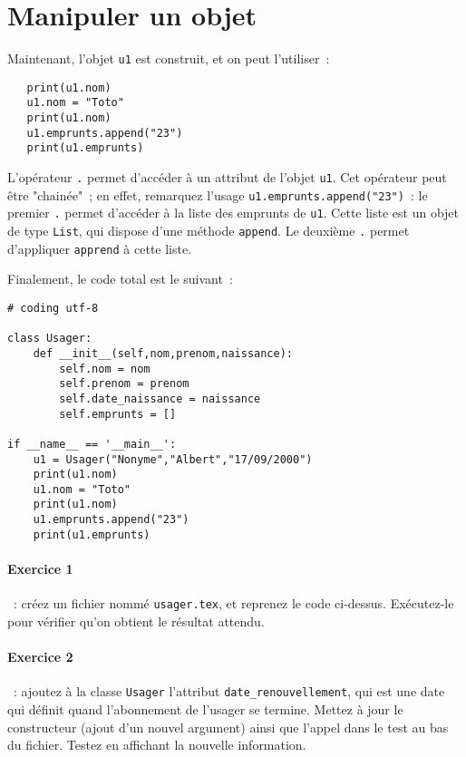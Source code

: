 \documentclass{article}
\begin{document}
\section{Manipuler un objet}

Maintenant, l'objet \texttt{u1} est construit, et on peut l'utiliser~:

\begin{verbatim}
   print(u1.nom)
   u1.nom = "Toto"
   print(u1.nom)
   u1.emprunts.append("23")
   print(u1.emprunts)
\end{verbatim}

L'opérateur \texttt{.} permet d'accéder à un attribut de l'objet \texttt{u1}. Cet opérateur peut être "chainée"~; en effet, remarquez l'usage  \texttt{u1.emprunts.append("23")}~: le premier \texttt{.} permet d'accéder à la liste des emprunts de \texttt{u1}. Cette liste est un objet de type \texttt{List}, qui dispose d'une méthode \texttt{append}. Le deuxième \texttt{.} permet d'appliquer \texttt{apprend} à cette liste. 

Finalement, le code total est le suivant~:


\begin{verbatim}
# coding utf-8

class Usager:
    def __init__(self,nom,prenom,naissance):
        self.nom = nom
        self.prenom = prenom
        self.date_naissance = naissance
        self.emprunts = []

if __name__ == '__main__':
    u1 = Usager("Nonyme","Albert","17/09/2000")
    print(u1.nom)
    u1.nom = "Toto"
    print(u1.nom)
    u1.emprunts.append("23")
    print(u1.emprunts)
\end{verbatim} 


\paragraph{Exercice 1}~: créez un fichier nommé \texttt{usager.tex}, et reprenez le code ci-dessus. Exécutez-le pour vérifier qu'on obtient le résultat attendu.


\paragraph{Exercice 2}~: ajoutez à la classe \texttt{Usager} l'attribut \texttt{date\_renouvellement}, qui est une date qui définit quand l'abonnement de l'usager se termine. Mettez à jour le constructeur (ajout d'un nouvel argument) ainsi que l'appel dans le test au bas du fichier. Testez en affichant la nouvelle information.
\end{document}
